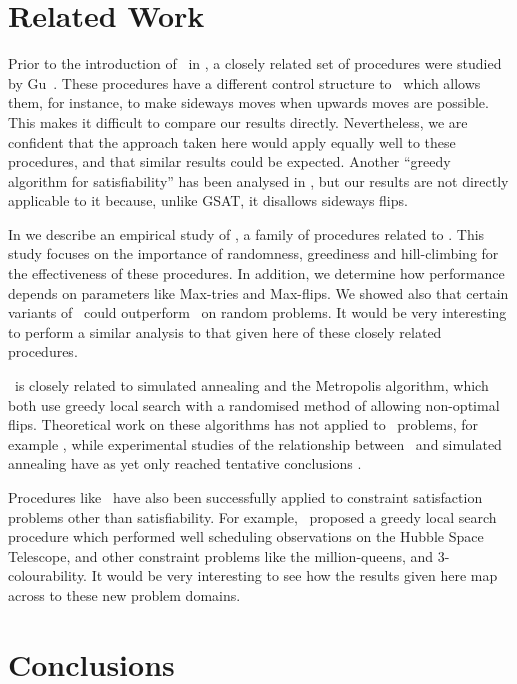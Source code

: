 \section{Related Work}
\label{sec-related}

Prior to the introduction of
\GSAT\ in  \cite{selman-gsat},
a closely related set of procedures were
studied by Gu~\cite{gu}.
These procedures have a different control structure to 
\GSAT\ which allows them, for instance, 
to make sideways moves when upwards moves are possible.  
This makes it difficult to compare our results directly. 
Nevertheless, we are confident that the approach taken here
would apply equally well to these procedures, and that 
similar results could be expected.
Another ``greedy algorithm for satisfiability'' 
has been analysed in \cite{greedy-alg},
but our results are not directly applicable to it because, unlike
GSAT, it disallows sideways flips.

In \cite{gensat} we describe an empirical
study of \GenSAT, a family of procedures related
to \GSAT. This study focuses on the importance
of randomness, greediness and hill-climbing for
the effectiveness of these procedures. In addition,
we determine how performance depends on parameters like
Max-tries and Max-flips.  We showed also that certain variants
of \GenSAT\ could outperform \GSAT\ on random problems. 
It would be very interesting to perform a similar analysis 
to that given here of these closely related procedures.

\GSAT\ is closely related to simulated annealing \cite{laarhoven1}
and the Metropolis algorithm, which both 
use greedy local search with a randomised method of 
allowing non-optimal flips.
Theoretical work on these algorithms has not applied to
\SAT\ problems, for example \cite{jerrum-cliques,jerrum-sorkin},
while experimental studies of the relationship between
\GSAT\ and simulated annealing have as yet only reached
tentative conclusions \cite{selman-kautz-93,spears-sa}.

Procedures like \GSAT\ have also been successfully
applied to constraint satisfaction
problems other than satisfiability. For 
example,~\cite{minton-heuristic-repair} proposed a 
greedy local search procedure which performed well
scheduling observations on the Hubble Space Telescope,
and other constraint problems like the million-queens, 
and 3-colourability. It would be very interesting to see how
the results given here map across to these new
problem domains.

\section{Conclusions}
\label{sec-conclusions}

